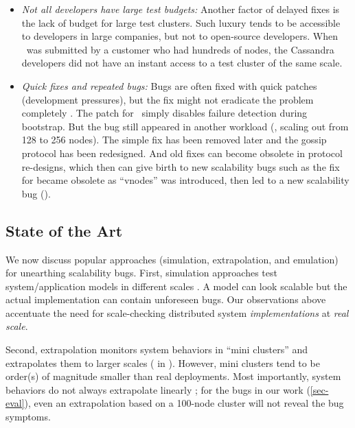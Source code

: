 \begin{itemize}
\item {\em Not all developers have large test budgets:}
%
Another factor of delayed fixes is the lack of budget for large
test clusters.  Such luxury tends to be accessible to developers
in large companies, but not to
open-source developers.  When
\caone\ was submitted by a customer who had hundreds of nodes, the
Cassandra developers did not have an instant access to a test cluster of
the same scale.

\item {\em Quick fixes and repeated bugs:} Bugs are often fixed with quick
patches (development pressures), but the fix might not eradicate the problem
completely \cite{Yin+11-FixesBecomeBugs}.
%
The patch for \caone\ simply disables failure detection during bootstrap. But
the bug still appeared in another workload (\eg, scaling out from 128 to 256
nodes).
%
The simple fix has been removed later and the gossip protocol has been
redesigned.
%
And old fixes can become obsolete in protocol re-designs, which then can give
birth to new scalability bugs such as the fix for  became obsolete as
``vnodes'' was introduced, then led to a new scalability bug ().

\end{itemize}

\subsection{State of the Art}

We now discuss popular approaches (simulation, extrapolation, and emulation) for
unearthing scalability bugs.
First, simulation approaches test system/application models in different scales
\cite{Calotoiu+13-ApmScaleBug, Laguna+15-DebugAtScale}. A model can look
scalable but the actual implementation can contain unforeseen bugs. Our
observations above accentuate the need for scale-checking distributed system
{\em implementations} at {\em real scale}.

Second, extrapolation monitors system behaviors in ``mini clusters'' and
extrapolates them to larger scales ( in \cite{Wang+14-Exalt}).  However,
mini clusters tend to be order(s) of magnitude smaller than real deployments.
Most importantly, system behaviors do not always extrapolate linearly
\cite{Wang+14-Exalt}; for the bugs in our work (\sec\ref{sec-eval}), even an
extrapolation based on a 100-node cluster will not reveal the bug symptoms.

